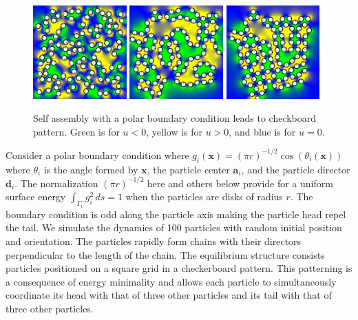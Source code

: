 \begin{figure}[h!]
  \begin{center}
    \includegraphics[width=0.32\textwidth]{figures/SpecificAim1/N100A1.pdf}
    \includegraphics[width=0.32\textwidth]{figures/SpecificAim1/N100A2.pdf}
    \includegraphics[width=0.32\textwidth]{figures/SpecificAim1/N100A3.pdf}
    \end{center}
  \caption{ Self assembly with a polar boundary condition leads to
  checkboard pattern.  Green is for $u < 0$, yellow is for $u > 0$, and
  blue is for $u = 0$.
    \label{fig:self-assemblyA}}
\end{figure}

Consider a polar boundary condition where
$g_i(\mathbf{x}) = (\pi r)^{-1/2} \cos (\theta_i(\mathbf{x}))$
where $\theta_i$ is the angle formed by $\mathbf{x}$, the particle
center $\mathbf{a}_i$, and the particle director $\mathbf{d}_i$.
The normalization $(\pi r)^{-1/2}$ here and others below
provide for a uniform surface energy $\int_{\Gamma_i} g_i^2 \,ds = 1$
when the particles are disks of radius $r$.
The boundary condition is odd along the particle axis 
making the particle head repel the tail.
We simulate the dynamics of 100 particles with random initial position
and orientation. The particles rapidly form chains with their
directors perpendicular to the length of the chain. The equilibrium
structure consists particles positioned on a square grid
in a checkerboard pattern. This patterning is a consequence of energy
minimality and allows each particle to simultaneously
coordinate its head with that of three other particles
and its tail with that of three other particles. 

